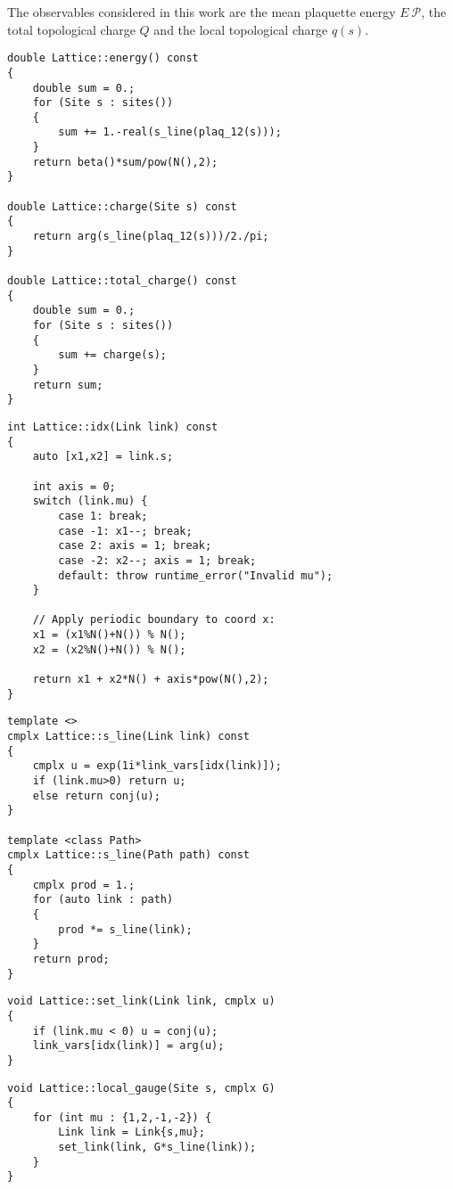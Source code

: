 The observables considered in this work are the mean plaquette energy $E_\
{\mathcal P}$, the total topological charge $Q$ and the local topological charge $q(s)$.

\begin{lstlisting}[caption={Lattice observables}]
double Lattice::energy() const
{
    double sum = 0.;
    for (Site s : sites())
    {
        sum += 1.-real(s_line(plaq_12(s)));
    }
    return beta()*sum/pow(N(),2);
}

double Lattice::charge(Site s) const
{
    return arg(s_line(plaq_12(s)))/2./pi;
}

double Lattice::total_charge() const
{
    double sum = 0.;
    for (Site s : sites())
    {
        sum += charge(s);
    }
    return sum;
}
\end{lstlisting}

\begin{lstlisting}[caption={Link indexing}]
int Lattice::idx(Link link) const
{
    auto [x1,x2] = link.s;
    
    int axis = 0;
    switch (link.mu) {
        case 1: break;
        case -1: x1--; break;
        case 2: axis = 1; break;
        case -2: x2--; axis = 1; break;
        default: throw runtime_error("Invalid mu");
    }

    // Apply periodic boundary to coord x:
    x1 = (x1%N()+N()) % N();
    x2 = (x2%N()+N()) % N();
    
    return x1 + x2*N() + axis*pow(N(),2);
}
\end{lstlisting}

\begin{lstlisting}[caption={Schwinger lines}]
template <>
cmplx Lattice::s_line(Link link) const
{
    cmplx u = exp(1i*link_vars[idx(link)]);
    if (link.mu>0) return u;
    else return conj(u);
}

template <class Path>
cmplx Lattice::s_line(Path path) const
{
    cmplx prod = 1.;
    for (auto link : path)
    {
        prod *= s_line(link);
    }
    return prod;
}
\end{lstlisting}

\begin{lstlisting}[caption={Link updating}]
void Lattice::set_link(Link link, cmplx u)
{
    if (link.mu < 0) u = conj(u);
    link_vars[idx(link)] = arg(u);
}
\end{lstlisting}

\begin{lstlisting}[caption={Local gauge transform}]
void Lattice::local_gauge(Site s, cmplx G)
{
    for (int mu : {1,2,-1,-2}) {
        Link link = Link{s,mu};
        set_link(link, G*s_line(link));
    }
}
\end{lstlisting}



